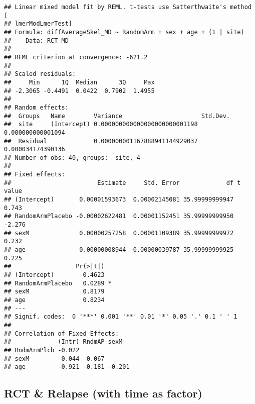 \documentclass[]{article}
\theoremstyle{definition}
\theoremstyle{definition}
\theoremstyle{definition}
\theoremstyle{remark}
\begin{document}
\begin{verbatim}
## Linear mixed model fit by REML. t-tests use Satterthwaite's method [
## lmerModLmerTest]
## Formula: diffAverageSkel_MD ~ RandomArm + sex + age + (1 | site)
##    Data: RCT_MD
## 
## REML criterion at convergence: -621.2
## 
## Scaled residuals: 
##     Min      1Q  Median      3Q     Max 
## -2.3065 -0.4491  0.0422  0.7902  1.4955 
## 
## Random effects:
##  Groups   Name        Variance                      Std.Dev.         
##  site     (Intercept) 0.000000000000000000000001198 0.000000000001094
##  Residual             0.000000001167888941144929037 0.000034174390136
## Number of obs: 40, groups:  site, 4
## 
## Fixed effects:
##                        Estimate     Std. Error             df t value
## (Intercept)       0.00001593673  0.00002145081 35.99999999947   0.743
## RandomArmPlacebo -0.00002622481  0.00001152451 35.99999999950  -2.276
## sexM              0.00000257258  0.00001109389 35.99999999972   0.232
## age               0.00000008944  0.00000039787 35.99999999925   0.225
##                  Pr(>|t|)  
## (Intercept)        0.4623  
## RandomArmPlacebo   0.0289 *
## sexM               0.8179  
## age                0.8234  
## ---
## Signif. codes:  0 '***' 0.001 '**' 0.01 '*' 0.05 '.' 0.1 ' ' 1
## 
## Correlation of Fixed Effects:
##             (Intr) RndmAP sexM  
## RndmArmPlcb -0.022              
## sexM        -0.044  0.067       
## age         -0.921 -0.181 -0.201
\end{verbatim}

\subsection{RCT \& Relapse (with time as
factor)}\label{rct-relapse-with-time-as-factor-3}
\end{document}
